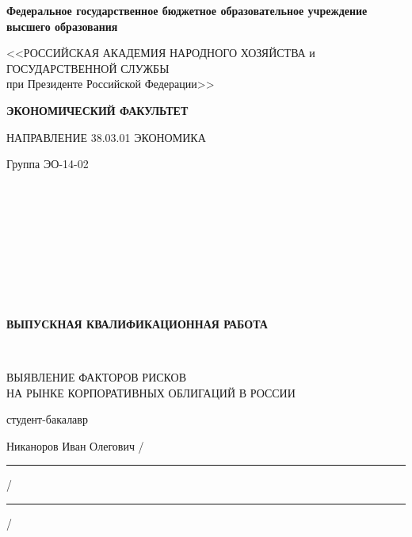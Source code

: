 
\thispagestyle{empty} %


\begingroup
{}  
\begin{center}
\small \bfseries Федеральное государственное бюджетное образовательное учреждение высшего образования

<<РОССИЙСКАЯ АКАДЕМИЯ НАРОДНОГО ХОЗЯЙСТВА и\\ ГОСУДАРСТВЕННОЙ СЛУЖБЫ \\
при Президенте Российской Федерации>>

\vspace{2ex}

\bfseries
ЭКОНОМИЧЕСКИЙ ФАКУЛЬТЕТ

НАПРАВЛЕНИЕ 38.03.01 ЭКОНОМИКА
\end{center}

\vfill


\noindent\small Группа ЭО-14-02
\hfill
\parbox[t]{20em}{\centering\small

\mbox{ }

%

\mbox{ }


\mbox{ }

}

\mbox{ }

\mbox{ }

\begin{center}\bfseries
ВЫПУСКНАЯ КВАЛИФИКАЦИОННАЯ РАБОТА

\mbox{ }

\large
ВЫЯВЛЕНИЕ ФАКТОРОВ РИСКОВ \\
НА РЫНКЕ КОРПОРАТИВНЫХ ОБЛИГАЦИЙ В РОССИИ
\end{center}

\vfill

\noindent\normalsize
студент-бакалавр

\noindent
Никаноров Иван Олегович
\hfill /\rule{6em}{0.5pt}/\rule{6em}{0.5pt}/

\hfill{}

